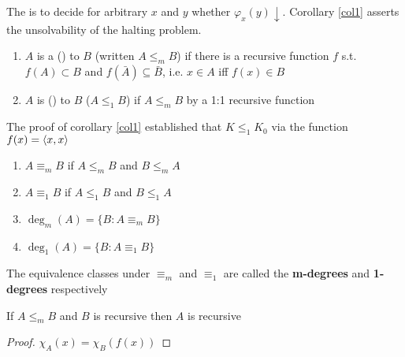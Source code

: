 \documentclass[11pt]{article}
\begin{document}
The  is to decide for arbitrary \(x\) and \(y\) whether
\(\varphi_x(y)\downarrow\). Corollary \ref{col1} asserts the unsolvability of the
halting problem.

\begin{definition}[]
\begin{enumerate}
\item \(A\) is a  () to \(B\) (written
\(A\le_m B\)) if there is a recursive function \(f\) s.t. \(f(A)\subset B\) and
\(f(\bar{A})\subseteq\bar{B}\), i.e. \(x\in A\) iff \(f(x)\in B\)
\item \(A\) is  () to \(B\) (\(A\le_1 B\)) if
\(A\le_m B\) by a 1:1 recursive function
\end{enumerate}
\end{definition}

The proof of corollary \ref{col1} established that \(K\le_1 K_0\) via the
function \(f(x)=\langle x,x\rangle\)
\begin{definition}[]
\begin{enumerate}
\item \(A\equiv_m B\) if \(A\le_m B\) and \(B\le_m A\)
\item \(A\equiv_1 B\) if \(A\le_1 B\) and \(B\le_1 A\)
\item \(\deg_m(A)=\{B:A\equiv_m B\}\)
\item \(\deg_1(A)=\{B:A\equiv_1 B\}\)
\end{enumerate}
\end{definition}

The equivalence classes under \(\equiv_m\) and \(\equiv_1\) are called the
\textbf{m-degrees} and \textbf{1-degrees} respectively

\begin{proposition}[]
If \(A\le_m B\) and \(B\) is recursive then \(A\) is recursive
\end{proposition}

\begin{proof}
\(\chi_A(x)=\chi_B(f(x))\)
\end{proof}
\end{document}
